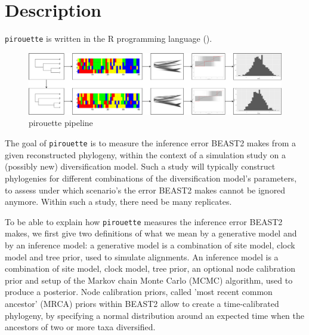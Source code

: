 \documentclass{article}
\begin{document}
\section{Description}

\verb;pirouette; is written in the R programming language (\cite{R}).

\begin{figure}
  \centering
  \includegraphics[width=\textwidth]{workflow.png}
  \caption{pirouette pipeline}
  \label{fig:pipeline}
\end{figure}

The goal of \verb;pirouette; is to measure the inference error BEAST2
makes from a given reconstructed phylogeny, within the context of
a simulation study on a (possibly new) diversification model. Such
a study will typically construct phylogenies for different combinations of
the diversification model's parameters, to assess under which scenario's
the error BEAST2 makes cannot be ignored anymore. Within such a study,
there need be many replicates.

To be able to explain how \verb;pirouette; measures the inference error
BEAST2 makes, we first give two definitions of what
we mean by a generative model and by an inference model: 
a generative model is a combination of site model, clock model and tree prior,
used to simulate alignments. An inference model is a combination of 
site model, clock model, tree prior, an optional node calibration prior
and setup of the Markov chain Monte Carlo (MCMC) algorithm, 
used to produce a posterior. Node calibration priors, called 'most
recent common ancestor' (MRCA) priors within BEAST2 allow to create a 
time-calibrated phylogeny, by specifying a normal distribution around
an expected time when the ancestors of two or more taxa diversified. 
\end{document}

